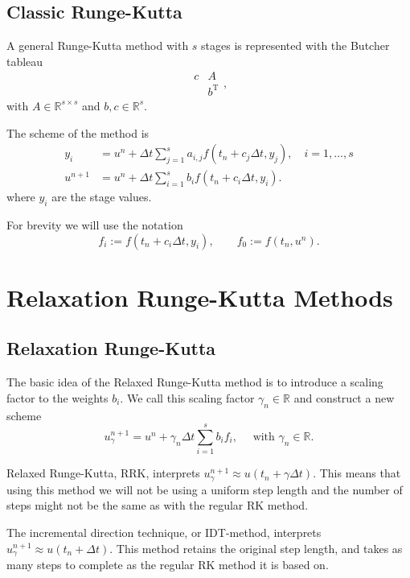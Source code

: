 \documentclass{article}
\newcommand{\T}{\mathrm{T}}
\begin{document}
\subsection{Classic Runge-Kutta}
    A general Runge-Kutta method with \(s\) stages is represented with the Butcher tableau
    \[\begin{array}{c|c}
        c & A\\
        \hline
        ~ & b^{\T}
    \end{array},\]
    with \(A \in \mathbb{R}^{s \times s}\) and \(b, c \in \mathbb{R}^s.\)

    \vspace*{7mm}
    \noindent
    The scheme of the method is
    \begin{align}
        y_i &= u^{n} + \Delta t\sum_{j=1}^{s} a_{i,j} f(t_n + c_j \Delta t, y_j), \quad i = 1,\ldots,s \label{Eq_RK_Stage} \\
        u^{n+1} &= u^{n} + \Delta t \sum_{i=1}^{s} b_i f(t_n + c_i \Delta t, y_i). \label{Eq_RK_Scheme}
    \end{align}
    where \(y_i\) are the stage values.

    \vspace*{7mm}
    \noindent
    For brevity we will use the notation
    \[f_i := f(t_n + c_i \Delta t, y_i), \qquad f_0 := f(t_n, u^n).\]


\section{Relaxation Runge-Kutta Methods}
\subsection{Relaxation Runge-Kutta}
    The basic idea of the Relaxed Runge-Kutta method is to introduce a scaling factor to the weights \(b_i\). We call this scaling factor \(\gamma_n \in \mathbb{R}\) and construct a new scheme
    \[u^{n+1}_{\gamma} = u^{n} + \gamma_n \Delta t \sum_{i=1}^{s} b_i f_i, \quad \text{ with } \gamma_n \in \mathbb{R}.\]

    \vspace*{10mm}
    Relaxed Runge-Kutta, RRK, interprets \(u_{\gamma}^{n+1} \approx u(t_n + \gamma \Delta t)\). This means that using this method we will not be using a uniform step length and the number of steps might not be the same as with the regular RK method.

    \vspace*{5mm}
    The incremental direction technique, or IDT-method, interprets \(u_{\gamma}^{n+1} \approx u(t_n + \Delta t)\). This method retains the original step length, and takes as many steps to complete as the regular RK method it is based on.
\end{document}
